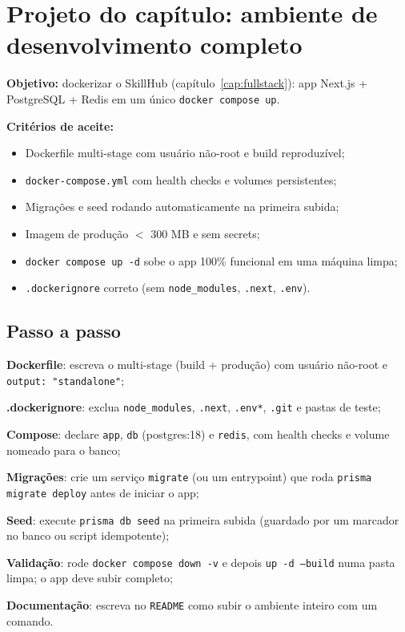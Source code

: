 \section{Projeto do capítulo: ambiente de desenvolvimento completo}
\label{sec:projeto17}

\begin{caixaprojeto}
\textbf{Objetivo:} dockerizar o SkillHub (capítulo~\ref{cap:fullstack}): app
Next.js + PostgreSQL + Redis em um único \texttt{docker compose up}.

\textbf{Critérios de aceite:}
\begin{itemize}[leftmargin=*, itemsep=0.2em]
  \item Dockerfile multi-stage com usuário não-root e build reproduzível;
  \item \texttt{docker-compose.yml} com health checks e volumes persistentes;
  \item Migrações e seed rodando automaticamente na primeira subida;
  \item Imagem de produção $<$ 300 MB e sem secrets;
  \item \texttt{docker compose up -d} sobe o app 100\% funcional em uma máquina limpa;
  \item \texttt{.dockerignore} correto (sem \texttt{node\_modules}, \texttt{.next}, \texttt{.env}).
\end{itemize}
\end{caixaprojeto}

\subsection{Passo a passo}

\begin{passos}
  \item \textbf{Dockerfile}: escreva o multi-stage (build + produção) com
  usuário não-root e \texttt{output: "standalone"};
  \item \textbf{.dockerignore}: exclua \texttt{node\_modules}, \texttt{.next},
  \texttt{.env*}, \texttt{.git} e pastas de teste;
  \item \textbf{Compose}: declare \texttt{app}, \texttt{db} (postgres:18) e
  \texttt{redis}, com health checks e volume nomeado para o banco;
  \item \textbf{Migrações}: crie um serviço \texttt{migrate} (ou um entrypoint)
  que roda \texttt{prisma migrate deploy} antes de iniciar o app;
  \item \textbf{Seed}: execute \texttt{prisma db seed} na primeira subida
  (guardado por um marcador no banco ou script idempotente);
  \item \textbf{Validação}: rode \texttt{docker compose down -v} e depois
  \texttt{up -d --build} numa pasta limpa; o app deve subir completo;
  \item \textbf{Documentação}: escreva no \texttt{README} como subir o
  ambiente inteiro com um comando.
\end{passos}

